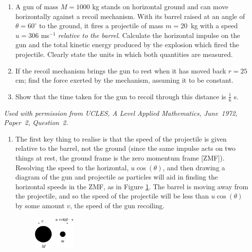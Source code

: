 
\begin{problem}[A1972AMIIQ2l] %
{\begin{enumerate}
	\item A gun of mass $M = 1000$ kg stands on horizontal ground and can move horizontally against a recoil mechanism. With its barrel raised at an angle of $\theta = 60^{\circ}$ to the ground, it fires a projectile of mass $m = 20$~kg with a speed $u = 306$ ms$^{-1}$ \emph{relative to the barrel}. Calculate the horizontal impulse on the gun and the total kinetic energy produced by the explosion which fired the projectile. Clearly state the units in which both quantities are measured.
	\item If the recoil mechanism brings the gun to rest when it has moved back $r = 25$ cm; find the force exerted by the mechanism, assuming it to be constant.
	\item Show that the time taken for the gun to recoil through this distance is $\frac{1}{6}$ s.
\end{enumerate}
}
{\textit{Used with permission from UCLES, A Level Applied Mathematics, June~1972, Paper~2, Question~2.}}
{\begin{enumerate}
	\item The first key thing to realise is that the speed of the projectile is given relative to the barrel, not the ground (since the same impulse acts on two things at rest, the ground frame is the zero momentum frame [ZMF]). Resolving the speed to the horizontal, $u \cos(\theta)$, and then drawing a diagram of the gun and projectile as particles will aid in finding the horizontal speeds in the ZMF, as in Figure \ref{fig:Dynamics_gun_speeds}. The barrel is moving away from the projectile, and so the speed of the projectile will be less than $u \cos(\theta)$ by some amount $v$, the speed of the gun recoiling.

\begin{figure}[h]
\centering
\includegraphics[width=0.2\textwidth]{../../../figures/Dynamics_gun_speeds}
\caption{}
\label{fig:Dynamics_gun_speeds}
\end{figure}


\end{enumerate}}
\end{problem}
